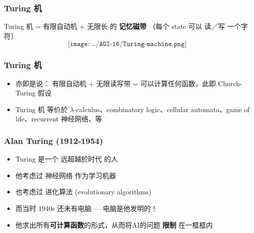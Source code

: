 \documentclass[17pt]{beamer}
\begin{document}
\begin{frame}
\frametitle{Turing 机}
	Turing 机 = 有限自动机 + 无限长 的 {\color{red}\textbf{记忆磁带}} （每个 state 可以 读／写 一个字符）\\
	\begin{equation}
	\label{fig:Turing-machine}
	\texttt{[image: ../AGI-16/Turing-machine.png]}
	\end{equation}
\end{frame}

\begin{frame}
\frametitle{Turing 机}
\begin{itemize}
	\item 亦即是说： 有限自动机 + 无限读写带 = 可以计算任何函数，此即 Church-Turing 假设
	\item Turing 机 等价於 $\lambda$-calculus、combinatory logic、cellular automata、game of life、recurrent 神经网络、等
\end{itemize}
\end{frame}

\begin{frame}
\frametitle{Alan Turing (1912-1954)}
\begin{itemize}
	\item Turing 是一个 远超越於时代 的人
	\item 他考虑过 神经网络 作为学习机器
	\item 也考虑过 进化算法 (evolutionary algorithms)
	\item 而当时 1940s 还未有电脑 --- 电脑是他发明的！
	\item {\color{red}他求出所有\textbf{可计算函数}的形式，从而将AI的问题 \textbf{限制} 在一框框内} 
\end{itemize}
\end{frame}
\end{document}
